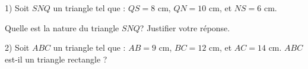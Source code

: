 \begin{minipage}{0.99\linewidth}

\exo


1) Soit $SNQ$ un triangle tel que : $QS=8$ cm, $QN=10$ cm, et $NS=6$ cm.\par
Quelle est la nature du triangle $SNQ$? \quad Justifier votre réponse.

2) Soit $ABC$ un triangle tel que : $AB=9$ cm, $BC=12$ cm, et $AC=14$ cm. $ABC$ est-il un triangle rectangle ? 

\end{minipage}
\vspace{0.5cm}
